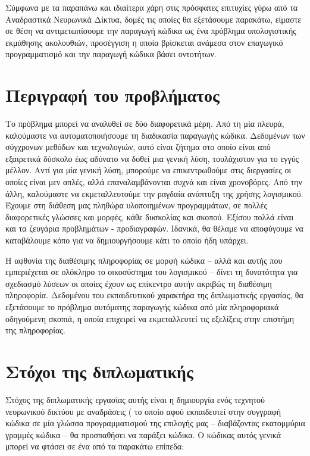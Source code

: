 Σύμφωνα με τα παραπάνω και ιδιαίτερα χάρη στις πρόσφατες επιτυχίες γύρω από τα Αναδραστικά Νευρωνικά Δίκτυα, δομές τις οποίες θα εξετάσουμε παρακάτω, είμαστε σε θέση να αντιμετωπίσουμε την παραγωγή κώδικα ως ένα πρόβλημα υπολογιστικής εκμάθησης ακολουθιών, προσέγγιση η οποία βρίσκεται ανάμεσα στον επαγωγικό προγραμματισμό και την παραγωγή κώδικα βάσει οντοτήτων.

\section{Περιγραφή του προβλήματος}
Το πρόβλημα μπορεί να αναλυθεί σε δύο διαφορετικά μέρη. Από τη μία πλευρά, καλούμαστε να αυτοματοποιήσουμε τη διαδικασία παραγωγής κώδικα. Δεδομένων των σύγχρονων μεθόδων και τεχνολογιών, αυτό είναι ζήτημα στο οποίο είναι από εξαιρετικά δύσκολο έως αδύνατο να δοθεί μια γενική λύση, τουλάχιστον για το εγγύς μέλλον. Αντί για μία γενική λύση, μπορούμε να επικεντρωθούμε στις διεργασίες οι οποίες είναι μεν απλές, αλλά επαναλαμβάνονται συχνά και είναι χρονοβόρες. Από την άλλη, καλούμαστε να εκμεταλλευτούμε την ραγδαία ανάπτυξη της χρήσης λογισμικού. Έχουμε στη διάθεση μας πληθώρα υλοποιημένων προγραμμάτων, σε πολλές διαφορετικές γλώσσες και μορφές, κάθε δυσκολίας και σκοπού. Εξίσου πολλά είναι και τα ζευγάρια προβλημάτων - προδιαγραφών. Ιδανικά, θα θέλαμε να αποφύγουμε να καταβάλουμε κόπο για να δημιουργήσουμε κάτι το οποίο ήδη υπάρχει. 

Η αφθονία της διαθέσιμης πληροφορίας σε μορφή κώδικα -- αλλά και αυτής που εμπεριέχεται σε ολόκληρο το οικοσύστημα του λογισμικού -- δίνει τη δυνατότητα για σχεδιασμό λύσεων οι οποίες έχουν ως επίκεντρο αυτήν ακριβώς τη διαθέσιμη πληροφορία. Δεδομένου του εκπαιδευτικού χαρακτήρα της διπλωματικής εργασίας, θα εξετάσουμε το πρόβλημα αυτόματης παραγωγής κώδικα από μία πληροφοριακά οδηγούμενη σκοπιά, η οποία επιχειρεί να εκμεταλλευτεί τις εξελίξεις στην επιστήμη της πληροφορίας.

\section{Στόχοι της διπλωματικής}


Στόχος της διπλωματικής εργασίας αυτής είναι η δημιουργία ενός τεχνητού νευρωνικού δικτύου με αναδράσεις ( το οποίο αφού εκπαιδευτεί στην συγγραφή κώδικα σε μία γλώσσα προγραμματισμού της επιλογής μας -- διαβάζοντας εκατομμύρια γραμμές κώδικα -- θα προσπαθήσει να παράξει κώδικα. Ο κώδικας αυτός γενικά μπορεί να φτάσει σε ένα από τα παρακάτω επίπεδα:

